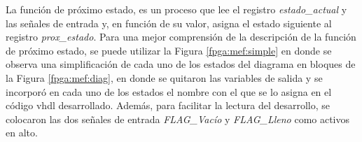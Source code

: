 La función de próximo estado, es un proceso que lee el registro \textit{estado\_actual} y las señales de entrada y, en función de su valor, asigna el estado siguiente al registro \textit{prox\_estado}. Para una mejor comprensión de la descripción de la función de próximo estado, se puede utilizar la Figura \ref{fpga:mef:simple} en donde se observa una simplificación de cada uno de los estados del diagrama en bloques de la Figura \ref{fpga:mef:diag}, en donde se quitaron las variables de salida y se incorporó en cada uno de los estados el nombre con el que se lo asigna en el código \acrshort{vhdl} desarrollado. Además, para facilitar la lectura del desarrollo, se colocaron las dos señales de entrada \textit{FLAG\_Vacío} y \textit{FLAG\_Lleno} como activos en alto.

